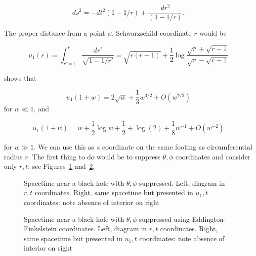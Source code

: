 \documentclass{article}
\begin{document}
\begin{equation}
  ds^2=-dt^2\left(1-1/r\right)
  +\frac{dr^2}{\left(1-1/r\right)}.
\end{equation}

The proper distance from a point at Schwarzschild coordinate $r$ would be

\begin{equation}
  u_1(r)=
  \int_{r'=1}^r\frac{dr'}{\sqrt{1-1/r'}}=
  \sqrt{r(r-1)} + \frac{1}{2}\log\frac{\sqrt{r}+\sqrt{r-1}}{\sqrt{r}-\sqrt{r-1}}
  \end{equation}

\cite{hankin2021} shows that



\begin{equation}
  u_1(1+w)=2\sqrt{w} + \frac{1}{3}w^{3/2} + O(w^{7/2})
\end{equation}
for $w\ll 1$, and 

\begin{equation}
  u_1(1+w)=w + \frac{1}{2}\log w + \frac{1}{2} +
  \log(2) + \frac{1}{8}w^{-1} + O(w^{-2})
\end{equation}

for $w\gg 1$.  We can use this as a coordinate on the same footing as
circumferential radius $r$.  The first thing to do would be to
suppress $\theta,\phi$ coordinates and consider only $r,t$; see
Figures~\ref{schwarzschild} and~\ref{eddington}.

\begin{figure}%
    \centering
    \caption{Spacetime near a black hole with $\theta,\phi$
      suppressed.  Left, diagram in $r,t$ coordinates.  Right, same
      spacetime but presented in $u_1,t$ coordinates: note absence of interior on right}
    \label{schwarzschild}%
\end{figure}

\begin{figure}%
    \centering
    \caption{Spacetime near a black hole with $\theta,\phi$ suppressed
      using Eddington-Finkelstein coordinates.  Left, diagram in $r,t$
      coordinates.  Right, same spacetime but presented in $u_1,t$
      coordinates: note absence of interior on right}
    \label{eddington}%
\end{figure}
\end{document}
